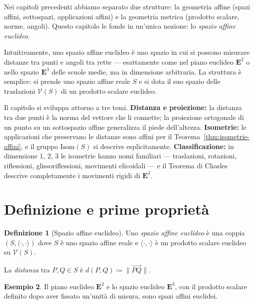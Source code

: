 \documentclass[11pt, a4paper]{book}
\theoremstyle{definition}
\newtheorem{definizione}{Definizione}[section]
\newtheorem{esempio}[definizione]{Esempio}
\theoremstyle{plain}
\theoremstyle{remark}
\begin{document}
Nei capitoli precedenti abbiamo separato due strutture: la geometria affine (spazi affini, sottospazi, applicazioni affini) e la geometria metrica (prodotto scalare, norme, angoli). Questo capitolo le fonde in un'unica nozione: lo \emph{spazio affine euclideo}.

Intuitivamente, uno spazio affine euclideo è uno spazio in cui si possono misurare distanze tra punti e angoli tra rette — esattamente come nel piano euclideo $\mathbf{E}^2$ o nello spazio $\mathbf{E}^3$ delle scuole medie, ma in dimensione arbitraria. La struttura è semplice: si prende uno spazio affine reale $S$ e si dota il suo spazio delle traslazioni $\mathcal{V}(S)$ di un prodotto scalare euclideo.

Il capitolo si sviluppa attorno a tre temi. \textbf{Distanza e proiezione:} la distanza tra due punti è la norma del vettore che li connette; la proiezione ortogonale di un punto su un sottospazio affine generalizza il piede dell'altezza. \textbf{Isometrie:} le applicazioni che preservano le distanze sono affini per il Teorema~\ref{thm:isometrie-affini}, e il gruppo $\mathrm{Isom}(S)$ si descrive esplicitamente. \textbf{Classificazione:} in dimensione $1$, $2$, $3$ le isometrie hanno nomi familiari --- traslazioni, rotazioni, riflessioni, glissoriflessioni, movimenti elicoidali --- e il Teorema di Chasles descrive completamente i movimenti rigidi di $\mathbf{E}^3$.

\section{Definizione e prime proprietà}
\label{sec:affine-euclideo-def}

\begin{defbox}
\begin{definizione}[Spazio affine euclideo]
\label{def:spazio-affine-euclideo}
Uno \emph{spazio affine euclideo} è una coppia $(S, \langle\cdot,\cdot\rangle)$ dove $S$ è uno spazio affine reale e $\langle\cdot,\cdot\rangle$ è un prodotto scalare euclideo su $\mathcal{V}(S)$.

La \emph{distanza} tra $P, Q \in S$ è $d(P,Q) \coloneqq \|\overrightarrow{PQ}\|$.
\end{definizione}
\end{defbox}

\begin{exbox}
\begin{esempio}
Il piano euclideo $\mathbf{E}^2$ e lo spazio euclideo $\mathbf{E}^3$, con il prodotto scalare definito dopo aver fissato un'unità di misura, sono spazi affini euclidei.
\end{esempio}
\end{exbox}
\end{document}
